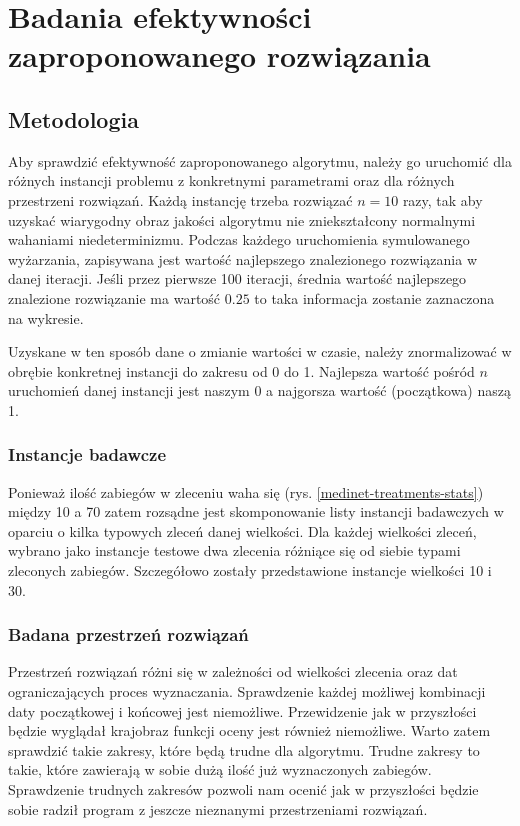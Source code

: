 \chapter{Badania efektywności zaproponowanego rozwiązania}
\section{Metodologia}
Aby sprawdzić efektywność zaproponowanego algorytmu, należy go uruchomić dla różnych instancji problemu
z konkretnymi parametrami oraz dla różnych przestrzeni rozwiązań. Każdą instancję trzeba rozwiązać $n=10$ razy,
tak aby uzyskać wiarygodny obraz jakości algorytmu nie
zniekształcony normalnymi wahaniami niedeterminizmu. Podczas każdego uruchomienia symulowanego wyżarzania,
zapisywana jest wartość najlepszego znalezionego rozwiązania w danej iteracji. Jeśli przez pierwsze 100 iteracji,
średnia wartość najlepszego znalezione rozwiązanie ma wartość
$0.25$ to taka informacja zostanie zaznaczona na wykresie.

Uzyskane w ten sposób dane o zmianie wartości w czasie, należy
znormalizować w obrębie konkretnej instancji do zakresu od 0 do 1. Najlepsza wartość
pośród $n$ uruchomień danej instancji jest naszym 0 a najgorsza wartość
(początkowa) naszą 1.

\subsection{Instancje badawcze}
Ponieważ ilość zabiegów w zleceniu waha się (rys. \ref{medinet-treatments-stats}) między 10 a 70
zatem rozsądne jest skomponowanie listy instancji badawczych w oparciu o kilka
typowych zleceń danej wielkości. Dla każdej wielkości zleceń, wybrano jako
instancje testowe dwa zlecenia różniące się od siebie typami zleconych zabiegów.
Szczegółowo zostały przedstawione instancje wielkości 10 i 30.
\newpage
\subsection{Badana przestrzeń rozwiązań}
Przestrzeń rozwiązań różni się w zależności od wielkości zlecenia oraz dat
ograniczających proces wyznaczania. Sprawdzenie każdej możliwej kombinacji daty
początkowej i końcowej jest niemożliwe. Przewidzenie jak w przyszłości będzie
wyglądał krajobraz funkcji oceny jest również niemożliwe. Warto zatem sprawdzić
takie zakresy, które będą trudne dla algorytmu. Trudne zakresy to takie, które
zawierają w sobie dużą ilość już wyznaczonych zabiegów. Sprawdzenie trudnych
zakresów pozwoli nam ocenić jak w przyszłości będzie sobie radził program z
jeszcze nieznanymi przestrzeniami rozwiązań.

